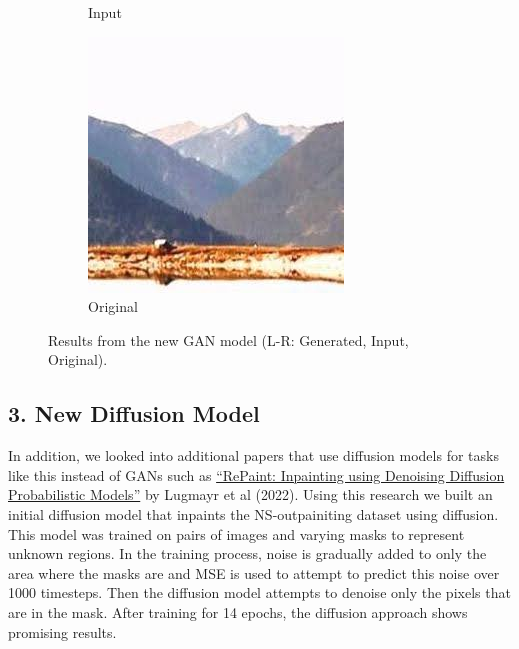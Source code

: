 \documentclass[sigconf]{acmart}
\begin{document}
\begin{figure}[h]
\begin{subfigure}[b]{0.3\linewidth}
        \caption{Input}
    \end{subfigure}
    \hfill
    \begin{subfigure}[b]{0.3\linewidth}
        \includegraphics[width=\linewidth]{original3.jpg}
        \caption{Original}
    \end{subfigure}
    \caption{Results from the new GAN model (L-R: Generated, Input, Original).}
\end{figure}

\subsection*{3. New Diffusion Model}
In addition, we looked into additional papers that use diffusion models for tasks like this instead of GANs such as \textcolor{red}{\href{https://arxiv.org/pdf/2201.09865}{“RePaint: Inpainting using Denoising Diffusion Probabilistic Models”}} by Lugmayr et al (2022). Using this research we built an initial diffusion model that inpaints the NS-outpainiting dataset using diffusion. This model was trained on pairs of images and varying masks to represent unknown regions. In the training process, noise is gradually added to only the area where the masks are and MSE is used to attempt to predict this noise over 1000 timesteps. Then the diffusion model attempts to denoise only the pixels that are in the mask. After training for 14 epochs, the diffusion approach shows promising results.  
\end{document}
